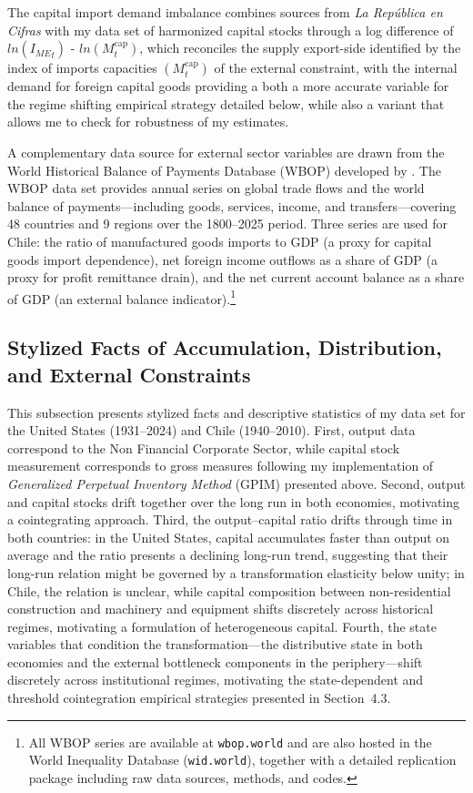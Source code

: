 The capital import demand imbalance combines sources from \textit{La República en Cifras} with my data set of harmonized capital stocks through a log difference of $ln({I_{ME}}_t)$ - $ln(M^{\text{cap}}_t)$, which reconciles the supply export-side identified by the index of imports capacities $(M^{\text{cap}}_t)$ of the external constraint, with the internal demand for foreign capital goods providing a both a more accurate variable for the regime shifting empirical strategy detailed below, while also a variant that allows me to check for robustness of my estimates. 

A complementary data source for external sector variables are drawn from the World Historical Balance of Payments Database (WBOP) developed by
\citet{NievasPiketty2025}. The WBOP data set provides annual series on global trade flows and the world balance of payments---including goods,
services, income, and transfers---covering 48 countries and 9 regions over
the 1800--2025 period. Three series are used for Chile: the ratio
of manufactured goods imports to GDP (a proxy for capital goods
import dependence), net foreign income outflows as a share of GDP (a
proxy for profit remittance drain), and the net current account
balance as a share of GDP (an external balance indicator).\footnote{All WBOP
	series are available at \texttt{wbop.world} and are also hosted in
	the World Inequality Database (\texttt{wid.world}), together with a
	detailed replication package including raw data sources, methods,
	and codes.}



\subsection{Stylized Facts of Accumulation, Distribution, and External Constraints}
\label{sec:4:stylized_facts}

This subsection presents stylized facts and descriptive statistics of my data set for the United States (1931--2024) and Chile (1940--2010). First, output data correspond to the Non Financial Corporate Sector, while capital stock measurement corresponds to gross measures following my implementation of \citet{Shaikh2016} \textit{Generalized Perpetual Inventory Method} (GPIM) presented above. Second, output and capital stocks drift together over the long run in both economies, motivating a cointegrating approach. Third, the output--capital ratio drifts through time in both countries: in the United States, capital accumulates faster than output on average and the ratio presents a declining long-run trend, suggesting that their long-run relation might be governed by a transformation elasticity below unity; in Chile, the relation is unclear, while capital composition between non-residential construction and machinery and equipment shifts discretely across historical regimes, motivating a formulation of heterogeneous capital. Fourth, the state variables that condition the transformation---the distributive state in both economies and the external bottleneck components in the periphery---shift discretely across institutional regimes, motivating the state-dependent and threshold cointegration empirical strategies presented in Section~4.3. 

